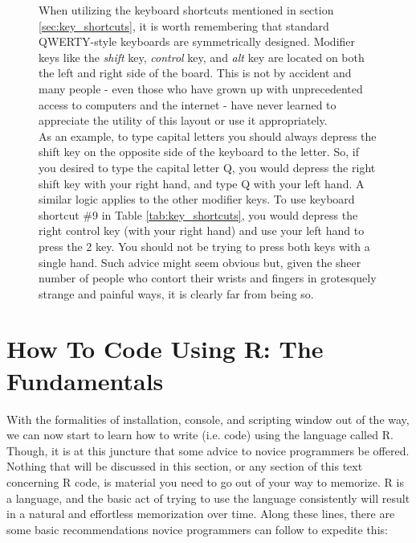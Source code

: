 \begin{figure}[!b]
    \centering
\begin{mdframed}[style = miscFrame, frametitle = Box 1.1: Are you using your keyboard properly?]

When utilizing the keyboard shortcuts mentioned in section \ref{sec:key_shortcuts}, it is worth remembering that standard QWERTY-style keyboards are symmetrically designed. Modifier keys like the \textit{shift} key, \textit{control} key, and \textit{alt} key are located on both the left and right side of the board.  This is not by accident and many people - even those who have grown up with unprecedented access to computers and the internet - have never learned to appreciate the utility of this layout or use it appropriately. \\

As an example, to type capital letters you should always depress the shift key on the opposite side of the keyboard to the letter. So, if you desired to type the capital letter Q, you would depress the right shift key with your right hand, and type Q with your left hand.  A similar logic applies to the other modifier keys. To use keyboard shortcut \#9 in Table \ref{tab:key_shortcuts}, you would depress the right control key (with your right hand) and use your left hand to press the 2 key.  You should not be trying to press both keys with a single hand.  Such advice might seem obvious but, given the sheer number of people who contort their wrists and fingers in grotesquely strange and painful ways, it is clearly far from being so.

\end{mdframed}
\end{figure}


\section{How To Code Using R: The Fundamentals}

With the formalities of installation, console, and scripting window out of the way, we can now start to learn how to write (i.e. code) using the language called R.  Though, it is at this juncture that some advice to novice programmers be offered.  Nothing that will be discussed in this section, or any section of this text concerning R code, is material you need to go out of your way to memorize.  R is a language, and the basic act of trying to use the language consistently will result in a natural and effortless memorization over time. Along these lines, there are some basic recommendations novice programmers can follow to expedite this:

